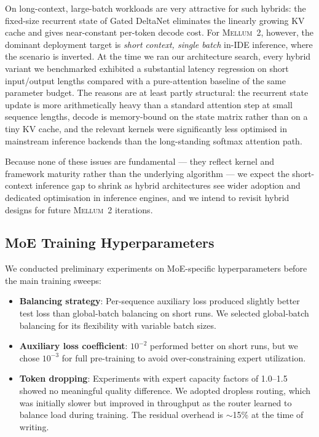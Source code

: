 \documentclass{llmxive}
\providecommand{\modelname}{\textsc{Mellum~2}\xspace}
\begin{document}
On long-context, large-batch workloads are very attractive for such hybrids: the
fixed-size recurrent state of Gated DeltaNet eliminates the linearly growing
KV cache and gives near-constant per-token decode cost. For \modelname{},
however, the dominant deployment target is \emph{short context, single batch}
in-IDE inference, where the scenario is inverted. At the time we ran our
architecture search, every hybrid variant we benchmarked exhibited a substantial latency regression on short
input/output lengths compared with a pure-attention baseline of the same
parameter budget. The reasons are at least partly structural: the recurrent
state update is more arithmetically heavy than a standard attention step at
small sequence lengths, decode is memory-bound on the state matrix rather
than on a tiny KV cache, and the relevant kernels were significantly less
optimised in mainstream inference backends than the long-standing softmax
attention path.

Because none of these issues are fundamental --- they reflect kernel and
framework maturity rather than the underlying algorithm --- we expect the
short-context inference gap to shrink as hybrid architectures see wider
adoption and dedicated optimisation in inference engines, and we intend to
revisit hybrid designs for future \modelname{} iterations.

\subsection{MoE Training Hyperparameters}
\label{app:moe-training}

We conducted preliminary experiments on MoE-specific hyperparameters before
the main training sweeps:

\begin{itemize}
  \item \textbf{Balancing strategy}: Per-sequence auxiliary loss produced
    slightly better test loss than global-batch balancing on short runs.
    We selected global-batch balancing for its flexibility with variable
    batch sizes.
  \item \textbf{Auxiliary loss coefficient}: $10^{-2}$ performed better on
    short runs, but we chose $10^{-3}$ for full pre-training to avoid
    over-constraining expert utilization.
  \item \textbf{Token dropping}: Experiments with expert capacity factors of
    1.0--1.5 showed no meaningful quality difference. We adopted dropless
    routing, which was initially slower but improved in throughput as the
    router learned to balance load during training. The residual overhead
    is ${\sim}$15\% at the time of writing.
\end{itemize}
\end{document}
